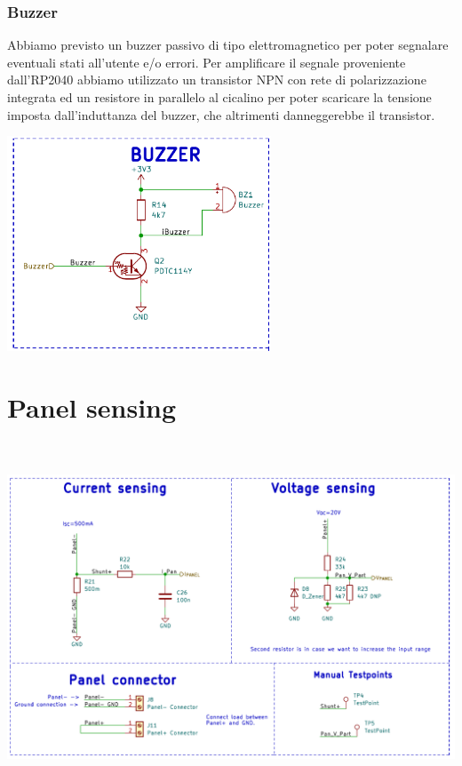 \hypertarget{buzzer}{%
\subsubsection{\texorpdfstring{\hfill\break
\hfill\break
Buzzer}{  Buzzer}}\label{buzzer}}

Abbiamo previsto un buzzer passivo di tipo elettromagnetico per poter
segnalare eventuali stati all'utente e/o errori. Per amplificare il
segnale proveniente dall'RP2040 abbiamo utilizzato un transistor NPN con
rete di polarizzazione integrata ed un resistore in parallelo al
cicalino per poter scaricare la tensione imposta dall'induttanza del
buzzer, che altrimenti danneggerebbe il transistor.

\begin{center}
\includegraphics[width=3.08958in,height=2.51619in]{figures/image38.png}
\captionsetup{type=figure}
\end{center}

\hypertarget{panel-sensing}{%
\section{\texorpdfstring{Panel sensing}{ Panel sensing}}\label{panel-sensing}}

\begin{center}
\includegraphics[width=6.5in,height=4.125in]{figures/image24.png}
\captionsetup{type=figure}
\end{center}

